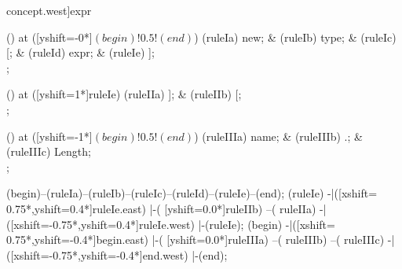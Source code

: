 \begin{syntax}[[xshift=22mm]concept.west]{expr}
  
  \node[sequence,column sep=1.5cm] () at ([yshift=-0*\syntaxruledist]$(begin)!0.5!(end)$) {
    \node[terminal]       (ruleIa) {new};
    &
    \node[nonterminal]    (ruleIb) {type};
    &
    \node[terminal]       (ruleIc) {[};
    &
    \node[nonterminal]    (ruleId) {expr};
    &
    \node[terminal]       (ruleIe) {]};
    \\
  };
  
  \node[sequence,column sep=0.4cm] () at ([yshift=1*\syntaxruledist]ruleIe) {
    \node[terminal]    (ruleIIa) {]};
    &
    \node[terminal]    (ruleIIb) {[};
    \\
  };
  
  \node[sequence,column sep=1.0cm] () at ([yshift=-1*\syntaxruledist]$(begin)!0.5!(end)$) {
    \node[nonterminal] (ruleIIIa) {name};
    &
    \node[terminal]    (ruleIIIb) {.};
    &
    \node[terminal]    (ruleIIIc) {Length};
    \\
  };
  
  \draw[path] (begin)--(ruleIa)--(ruleIb)--(ruleIc)--(ruleId)--(ruleIe)--(end);
  \draw[path] (ruleIe)
            -|([xshift= 0.75*\syntaxruledist,yshift=0.4*\syntaxruledist]ruleIe.east)
            |-(                             [yshift=0.0*\syntaxruledist]ruleIIb)
            --(                                                         ruleIIa)
            -|([xshift=-0.75*\syntaxruledist,yshift=0.4*\syntaxruledist]ruleIe.west)
            |-(ruleIe);
  \draw[path] (begin)
            -|([xshift= 0.75*\syntaxruledist,yshift=-0.4*\syntaxruledist]begin.east)
            |-(                             [yshift=0.0*\syntaxruledist]ruleIIIa)
            --(                                                         ruleIIIb)
            --(                                                         ruleIIIc)
            -|([xshift=-0.75*\syntaxruledist,yshift=-0.4*\syntaxruledist]end.west)
            |-(end);
\end{syntax}

